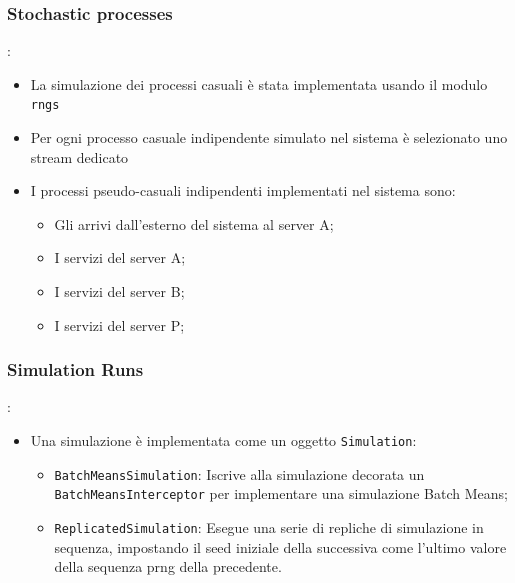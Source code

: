 \subsubsection{Stochastic processes}
\begin{frame}{\subsecname: \subsubsecname}
    \begin{itemize}
        \item La simulazione dei processi casuali è stata implementata usando il modulo \texttt{rngs} \citep{des}
        \item Per ogni processo casuale indipendente simulato nel sistema è selezionato uno stream dedicato
        \item I processi pseudo-casuali indipendenti implementati nel sistema sono:
        \begin{itemize}
            \item  Gli arrivi dall’esterno del sistema al server A;
            \item I servizi del server A;
            \item I servizi del server B;
            \item I servizi del server P;
        \end{itemize}
    \end{itemize}
\end{frame}

\subsubsection{Simulation Runs}
\begin{frame}{\subsecname: \subsubsecname}
    \begin{itemize}
        \item Una simulazione è implementata come un oggetto \texttt{Simulation}: \ 
        \begin{itemize}
            \item \texttt{BatchMeansSimulation}: Iscrive alla simulazione decorata un \texttt{BatchMeansInterceptor} per implementare una simulazione Batch Means;
            \item \texttt{ReplicatedSimulation}: Esegue una serie di repliche di simulazione in sequenza, impostando il seed iniziale della successiva come l'ultimo valore della sequenza prng della precedente.
        \end{itemize}
    \end{itemize}    
\end{frame}